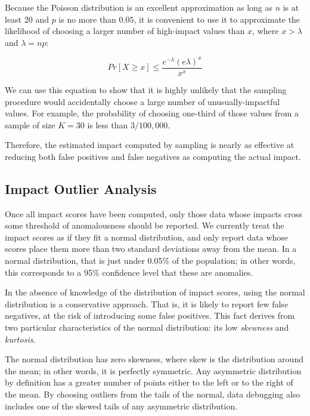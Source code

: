 Because the Poisson distribution is an excellent approximation as long
as $n$ is at least 20 and $p$ is no more than $0.05$, it is convenient
to use it to approximate the likelihood of choosing a larger number of
high-impact values than $x$, where $x > \lambda$ and $\lambda = np$:

\begin{equation}
Pr[X \geq x] \leq \frac{e^{-\lambda}(e \lambda)^x}{x^x}
\end{equation}

We can use this equation to show that it is highly unlikely that the
sampling procedure would accidentally choose a large number of
unusually-impactful values. For example, the probability of choosing
one-third of those values from a sample of size $K = 30$ is less than
$3/100,000$.

Therefore, the estimated impact computed by sampling is
nearly as effective at reducing both false positives and false
negatives as computing the actual impact.

\subsection{Impact Outlier Analysis}
\label{sec:outlier_analysis}

Once all impact scores have been computed, only those data whose
impacts cross some threshold of anomalousness should be
reported. We currently treat the impact scores as if they fit a normal
distribution, and only report data whose scores place them more
than two standard deviations away from the mean. In a normal
distribution, that is just under 0.05\% of the population; in other
words, this corresponds to a 95\% confidence level that these are
anomalies.

In the absence of knowledge of the distribution of impact scores, using
the normal distribution is a conservative approach. That is, it
is likely to report few false negatives, at the risk of introducing some false
positives. This fact derives from two particular characteristics of the
normal distribution: its low \emph{skewness} and \emph{kurtosis}.

The normal distribution has zero skewness, where skew is the
distribution around the mean; in other words, it is perfectly
symmetric. Any asymmetric distribution by definition has a greater
number of points either to the left or to the right of the mean. By
choosing outliers from the tails of the normal, data debugging also
includes one of the skewed tails of any asymmetric distribution.

